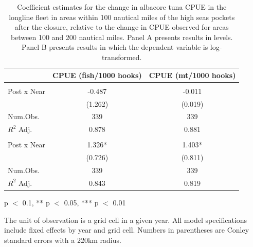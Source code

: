 \begin{table}
\centering
\begin{threeparttable}
\small
\caption{\label{tab:h3_reg_alb_ll}Coefficient estimates for the change in albacore tuna CPUE in the longline fleet in
             areas within 100 nautical miles of the high seas pockets after the closure, relative to the change in CPUE
             observed for areas between 100 and 200 nautical miles.
             Panel A presents results in levels. Panel B presents results in which the dependent variable is log-transformed.}
\centering
\begin{tabular}[t]{lcc}
\toprule
  & CPUE (fish/1000 hooks) & CPUE (mt/1000 hooks)\\
\midrule
\addlinespace[0.5em]
\multicolumn{3}{l}{\textit{A) Levels}}\\
\midrule \hspace{1em}Post x Near & -0.487 & -0.011\\
\hspace{1em} & (1.262) & (0.019)\\
\hspace{1em}Num.Obs. & 339 & \vphantom{1} 339\\
\hspace{1em}$R^2$ Adj. & 0.878 & 0.881\\
\addlinespace[0.5em]
\multicolumn{3}{l}{\textit{B) Log-transformed}}\\
\midrule \hspace{1em}Post x Near & 1.326* & 1.403*\\
\hspace{1em} & (0.726) & (0.811)\\
\hspace{1em}Num.Obs. & 339 & 339\\
\hspace{1em}$R^2$ Adj. & 0.843 & 0.819\\
\bottomrule
\end{tabular}
\begin{tablenotes}
\small
\item * p $<$ 0.1, ** p $<$ 0.05, *** p $<$ 0.01
\item The unit of observation is a grid cell in a given year. All model specifications include fixed effects by year and grid cell. Numbers in parentheses are Conley standard errors with a 220km radius.
\end{tablenotes}
\end{threeparttable}
\end{table}
